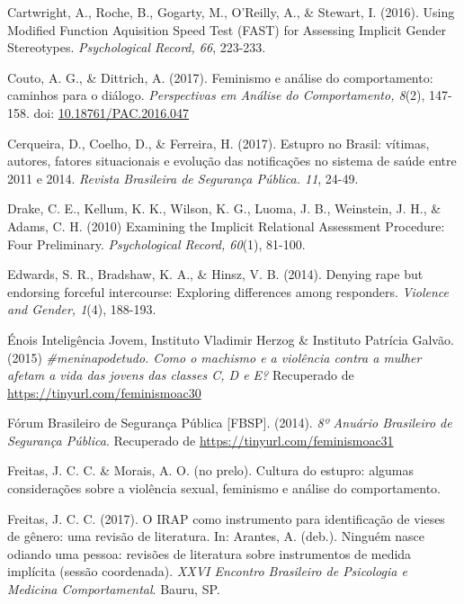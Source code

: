 \hangindent=25pt
\noindent Cartwright, A., Roche, B., Gogarty, M., O'Reilly, A., \& Stewart, I. (2016). Using Modified Function Aquisition Speed Test (FAST) for Assessing Implicit Gender Stereotypes. \textit{Psychological Record, 66}, 223-233.

\hangindent=25pt
\noindent Couto, A. G., \& Dittrich, A. (2017). Feminismo e análise do comportamento: caminhos para o diálogo. \textit{Perspectivas em Análise do Comportamento, 8}(2), 147-158. doi: \url{10.18761/PAC.2016.047}

\hangindent=25pt
\noindent Cerqueira, D., Coelho, D., \& Ferreira, H. (2017). Estupro no Brasil: vítimas, autores, fatores situacionais e evolução das notificações no sistema de saúde entre 2011 e 2014. \textit{Revista Brasileira de Segurança Pública. 11}, 24-49. 

\hangindent=25pt
\noindent Drake, C. E., Kellum, K. K., Wilson, K. G., Luoma, J. B., Weinstein, J. H., \& Adams, C. H. (2010) Examining the Implicit Relational Assessment Procedure: Four Preliminary. \textit{Psychological Record, 60}(1), 81-100.

\hangindent=25pt
\noindent Edwards, S. R., Bradshaw, K. A., \& Hinsz, V. B. (2014). Denying rape but endorsing forceful intercourse: Exploring differences among responders. \textit{Violence and Gender, 1}(4), 188-193.

\hangindent=25pt
\noindent Énois Inteligência Jovem, Instituto Vladimir Herzog \& Instituto Patrícia Galvão. (2015) \textit{\#meninapodetudo. Como o machismo e a violência contra a mulher afetam a vida das jovens das classes C, D e E?} Recuperado de \url{https://tinyurl.com/feminismoac30} 

\hangindent=25pt
\noindent Fórum Brasileiro de Segurança Pública [FBSP]. (2014). \textit{8º Anuário Brasileiro de Segurança Pública}. Recuperado de \url{https://tinyurl.com/feminismoac31}

\hangindent=25pt
\noindent Freitas, J. C. C. \& Morais, A. O. (no prelo). Cultura do estupro: algumas considerações sobre a violência sexual, feminismo e análise do comportamento.

\hangindent=25pt
\noindent Freitas, J. C. C. (2017). O IRAP como instrumento para identificação de vieses de gênero: uma revisão de literatura. In: Arantes, A. (deb.). Ninguém nasce odiando uma pessoa: revisões de literatura sobre instrumentos de medida implícita (sessão coordenada). \textit{XXVI Encontro Brasileiro de Psicologia e Medicina Comportamental}. Bauru, SP.


